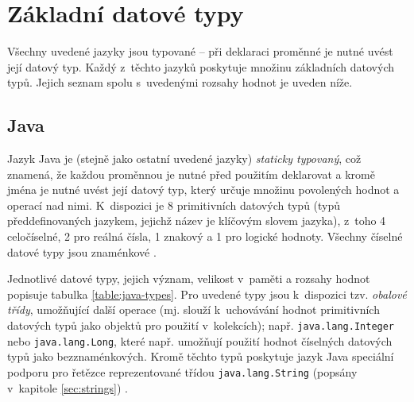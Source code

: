 \documentclass[czech,BP]{thesiskiv}
\begin{document}
\section{Základní datové typy}
Všechny uvedené jazyky jsou typované -- při deklaraci proměnné je nutné uvést její datový typ. Každý z~těchto jazyků poskytuje množinu základních datových typů. Jejich seznam spolu s~uvedenými rozsahy hodnot je uveden níže.

\subsection{Java}
Jazyk Java je (stejně jako ostatní uvedené jazyky) \textit{staticky typovaný}, což znamená, že každou proměnnou je nutné před použitím deklarovat a kromě jména je nutné uvést její datový typ, který určuje množinu povolených hodnot a operací nad nimi. K~dispozici je 8 primitivních datových typů (typů předdefinovaných jazykem, jejichž název je klíčovým slovem jazyka), z~toho 4 celočíselné, 2 pro reálná čísla, 1 znakový a 1 pro logické hodnoty. Všechny číselné datové typy jsou znaménkové \cite{java-book, java-guide-types}.\par

Jednotlivé datové typy, jejich význam, velikost v~paměti a rozsahy hodnot popisuje tabulka \ref{table:java-types}. Pro uvedené typy jsou k~dispozici tzv. \textit{obalové třídy}, umožňující další operace (mj. slouží k~uchovávání hodnot primitivních datových typů jako objektů pro použití v~kolekcích); např. \texttt{java.lang.Integer} nebo \texttt{java.lang.Long}, které např. umožňují použití hodnot číselných datových typů jako bezznaménkových. Kromě těchto typů poskytuje jazyk Java speciální podporu pro řetězce reprezentované třídou \texttt{java.lang.String} (popsány v~kapitole \ref{sec:strings}) \cite{java-guide-types, java-guide-byte, java-guide-short, java-guide-integer, java-guide-long, java-guide-float, java-guide-double, java-guide-boolean, java-guide-character}.
\end{document}
